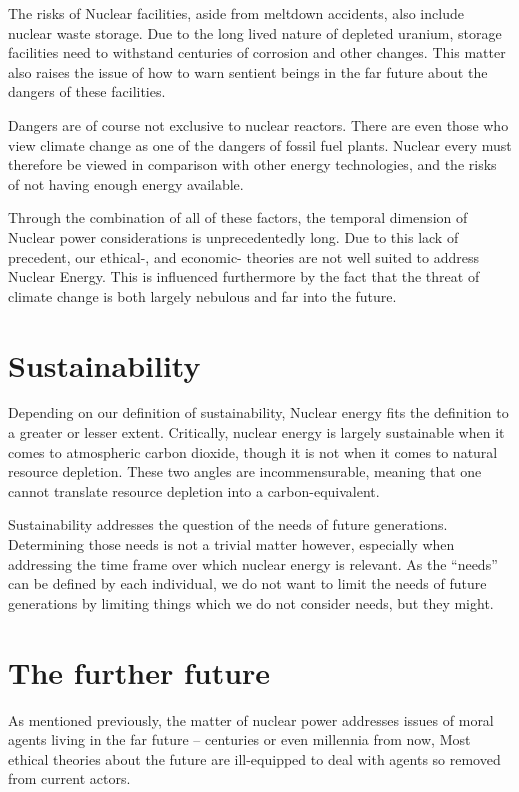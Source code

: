 \documentclass[12pt]{report}
\begin{document}
The risks of Nuclear facilities, aside from meltdown accidents, also include
nuclear waste storage. Due to the long lived nature of depleted uranium, storage
facilities need to withstand centuries of corrosion and other changes. This
matter also raises the issue of how to warn sentient beings in the far future
about the dangers of these facilities.

Dangers are of course not exclusive to nuclear reactors. There are even those
who view climate change as one of the dangers of fossil fuel plants. Nuclear
every must therefore be viewed in comparison with other energy technologies, and
the risks of not having enough energy available.

Through the combination of all of these factors, the temporal dimension of
Nuclear power considerations is unprecedentedly long. Due to this lack of
precedent, our ethical-, and economic- theories are not well suited to address
Nuclear Energy. This is influenced furthermore by the fact that the threat of
climate change is both largely nebulous and far into the future.

\section{Sustainability}

Depending on our definition of sustainability, Nuclear energy fits the
definition to a greater or lesser extent. Critically, nuclear energy is largely
sustainable when it comes to atmospheric carbon dioxide, though it is not when
it comes to natural resource depletion. These two angles are incommensurable,
meaning that one cannot translate resource depletion into a carbon-equivalent.

Sustainability addresses the question of the needs of future generations.
Determining those needs is not a trivial matter however, especially when
addressing the time frame over which nuclear energy is relevant. As the
``needs'' can be defined by each individual, we do not want to limit the needs
of future generations by limiting things which we do not consider needs, but
they might.

\section{The further future}

As mentioned previously, the matter of nuclear power addresses issues of moral
agents living in the far future -- centuries or even millennia from now, Most
ethical theories about the future are ill-equipped to deal with agents so
removed from current actors. 
\end{document}
